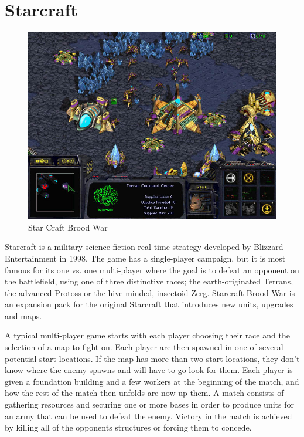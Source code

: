 
\section{Starcraft}

\begin{figure}[h!tb]
\centering
\includegraphics[scale=0.5]{graphics/scbw.jpg}
\caption{Star Craft Brood War}
\label{fig:scbwIntro}
\end{figure}

Starcraft is a military science fiction real-time strategy developed by Blizzard
Entertainment in 1998.\cite{starcraft} The game has a single-player campaign,
but it is most famous for its one vs. one multi-player where the goal is to
defeat an opponent on the battlefield, using one of three distinctive races;
the earth-originated Terrans, the advanced Protoss or the hive-minded,
insectoid Zerg. Starcraft Brood War is an expansion pack for the original
Starcraft that introduces new units, upgrades and maps. 

A typical multi-player game starts with each player choosing their race and the
selection of a map to fight on. Each player are then spawned in one of
several potential start locations. If the map has more than two start
locations, they don't know where the enemy spawns and will have to go look for
them. Each player is given a foundation building and a few workers at the
beginning of the match, and how the rest of the match then unfolds are now up
them. A match consists of gathering resources and securing one or more bases in
order to produce units for an army that can be used to defeat the enemy. Victory
in the match is achieved by killing all of the opponents structures or forcing
them to concede.


